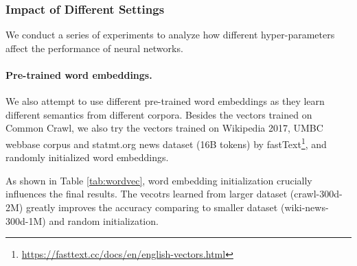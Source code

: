 \documentclass[11pt,letterpaper]{article}
\begin{document}
\subsubsection{Impact of Different Settings}
    We conduct a series of experiments to analyze how different hyper-parameters
    affect the performance of neural networks. 

    \begin{table}[htbp]
        \centering
        \caption{\label{tab:wordvec} Accuracies of TextCNN-300 and DPCNN-2 with different word embedding initializations.}
    \end{table}

    \paragraph{Pre-trained word embeddings.} We also attempt to use different
    pre-trained word embeddings as they learn different semantics from different
    corpora. Besides the vectors trained on Common Crawl, we also try the 
    vectors trained on Wikipedia 2017, UMBC webbase corpus and statmt.org news 
    dataset (16B tokens) by fastText\footnote{\url{https://fasttext.cc/docs/en/english-vectors.html}},
    and randomly initialized word embeddings.

    As shown in Table \ref{tab:wordvec}, word embedding initialization crucially 
    influences the final results. The vecotrs learned from larger dataset 
    (crawl-300d-2M) greatly improves the accuracy comparing to smaller dataset 
    (wiki-news-300d-1M) and random initialization. 
\end{document}
